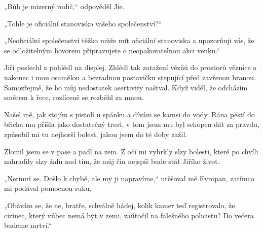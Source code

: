 „Bůh je mizerný rodič,“ odpověděl Jie. 

„Tohle je oficiální stanovisko vašeho společenství?“

„Neoficiální společenství těžko může mít oficiální stanoviska a upozorňuji vás, že se odložitelným hovorem připravujete o neopakovatelnou akci venku.“

 Jiří poslechl a pohlédl na displej. Zhlédl tak zatažení vězňů do prostorů věznice a nakonec i mou osamělou a bezradnou postavičku stepující před zavřenou branou. Samozřejmě, že ho můj nedostatek asertivity naštval. Když viděl, že odcházím směrem k řece, rozlíceně se rozběhl za mnou.
 
Našel mě, jak stojím s pistolí u spánku a dívám se kamsi do vody. Rána pěstí do břicha mu přišla jako dostatečný trest, v tom jsem mu byl schopen dát za pravdu, způsobil mi tu nejhorší bolest, jakou jsem do té doby zažil.

Zlomil jsem se v pase a padl na zem. Z očí mi vyhrkly slzy bolesti, které po chvíli nahradily slzy žalu nad tím, že můj čin nejspíš bude stát Jiřího život.
 
„Nermuť se. Došlo k chybě, ale my ji napravíme,“ utěšoval mě Evropan, zatímco mi podával pomocnou ruku.

„Obávám se, že ne, bratře, schválně hádej, kolik kamer teď registrovalo, že cizinec, který vůbec nemá být v zemi, zaútočil na falešného policistu? Do večera budeme mrtví.“
